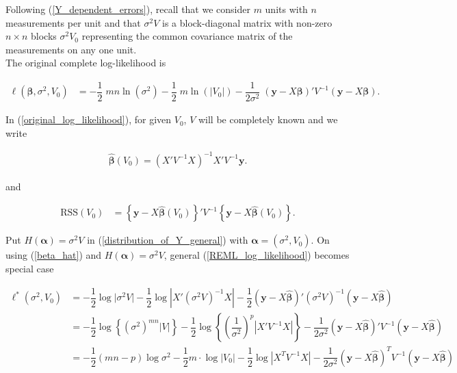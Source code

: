 \documentclass[11pt, a4paper]{article}
\newcommand{\bs}[1]{\boldsymbol{#1}}
\begin{document}
\fcAntA[scale = 0.4, draw = red, line width = 1] Following (\ref{Y_dependent_errors}), recall that we consider $m$ units with $n$ measurements per unit and that $\sigma^2V$ is a block-diagonal matrix with non-zero $n \times n$ blocks $\sigma^2V_0$ representing the common covariance matrix of the measurements on any one unit. \\[0.5em]

The original complete log-likelihood is

\begin{align}\label{original_log_likelihood}
\ell(\boldsymbol{\beta}, \sigma^2, V_0) &= -\dfrac{1}{2} \; mn \ln(\sigma^2) - \dfrac{1}{2} \; m \ln(\left| V_0 \right|) - \dfrac{1}{2\sigma^2} \; (\boldsymbol{y} - X\boldsymbol{\beta})' V^{-1} (\boldsymbol{y} - X\boldsymbol{\beta}).
\end{align}

In (\ref{original_log_likelihood}), for given $V_0$, $V$ will be completely known and we write

\begin{align}\label{beta_hat}
\widehat{\boldsymbol{\beta}}(V_0) = (X'V^{-1}X)^{-1}X'V^{-1}\boldsymbol{y}.
\end{align}

and

\begin{align}\label{RSS}
\text{RSS}(V_0) &= \left\{\boldsymbol{y} - X\widehat{\boldsymbol{\beta}}(V_0)\right\}' V^{-1} \left\{\boldsymbol{y} - X\widehat{\boldsymbol{\beta}}(V_0)\right\}.
\end{align}

Put $H(\bs{\alpha}) = \sigma^2 V$ in (\ref{distribution_of_Y_general}) with $\bs{\alpha} = (\sigma^2, V_0)$. On using (\ref{beta_hat}) and $H(\bs{\alpha}) = \sigma^2 V$, general (\ref{REML_log_likelihood}) becomes special case

\begin{align}\label{REML_likelihood_special_case}
\ell^{*}(\sigma^2, V_0)
&=
-\dfrac{1}{2}
\log \lvert \sigma^2 V \rvert
-
\dfrac{1}{2}
\log
\left\lvert
X'(\sigma^2 V)^{-1}X
\right\rvert
-
\dfrac{1}{2}
\left(
\bs{y} - X\widehat{\bs{\beta}}
\right)'
(\sigma^2 V)^{-1}
\left(
\bs{y} - X\widehat{\bs{\beta}}
\right) \nonumber \\[1.5em]
&=
-\dfrac{1}{2}
\log \left\{ (\sigma^2)^{mn} \lvert V \rvert \right\}
-
\dfrac{1}{2}
\log \left\{
\left( \dfrac{1}{\sigma^2} \right)^p
\left\lvert
X'V^{-1}X
\right\rvert
\right\}
-
\dfrac{1}{2\sigma^2}
\left(
\bs{y} - X\widehat{\bs{\beta}}
\right)'
V^{-1}
\left(
\bs{y} - X\widehat{\bs{\beta}}
\right) \nonumber \\[0.5em]
&=
-\dfrac{1}{2}(mn-p)\log \sigma^2
-
\dfrac{1}{2} m \cdot \log \lvert V_0 \rvert
-
\dfrac{1}{2}
\log
\left\lvert
X^{T}V^{-1}X
\right\rvert
-
\dfrac{1}{2\sigma^2}
\left(
\bs{y}-X\widehat{\bs{\beta}}
\right)^{T}
V^{-1}
\left(
\bs{y}-X\widehat{\bs{\beta}}
\right)
\end{align}
\end{document}
